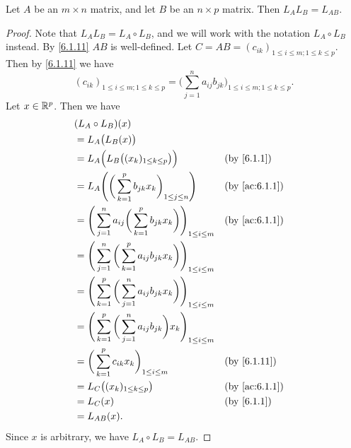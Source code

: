 \begin{lem}\label{6.1.16}
  Let \(A\) be an \(m \times n\) matrix, and let \(B\) be an \(n \times p\) matrix.
  Then \(L_A L_B = L_{AB}\).
\end{lem}

\begin{proof}
  Note that \(L_A L_B = L_A \circ L_B\), and we will work with the notation \(L_A \circ L_B\) instead.
  By \cref{6.1.11} \(AB\) is well-defined.
  Let \(C = AB = (c_{ik})_{1 \leq i \leq m ; 1 \leq k \leq p}\).
  Then by \cref{6.1.11} we have
  \[
    (c_{ik})_{1 \leq i \leq m ; 1 \leq k \leq p} = \bigg(\sum_{j = 1}^n a_{ij} b_{jk}\bigg)_{1 \leq i \leq m ; 1 \leq k \leq p}.
  \]
  Let \(x \in \mathbb{R}^p\).
  Then we have
  \begin{align*}
     & (L_A \circ L_B)(x)                                                                                             \\
     & = L_A\big(L_B(x)\big)                                                                                          \\
     & = L_A\Big(L_B\big((x_k)_{1 \leq k \leq p}\big)\Big)                                         &  & \by{6.1.1}    \\
     & = L_A\Bigg(\bigg(\sum_{k = 1}^p b_{jk} x_k\bigg)_{1 \leq j \leq n}\Bigg)                    &  & \by{ac:6.1.1} \\
     & = \Bigg(\sum_{j = 1}^n a_{ij} \bigg(\sum_{k = 1}^p b_{jk} x_k\bigg)\Bigg)_{1 \leq i \leq m} &  & \by{ac:6.1.1} \\
     & = \Bigg(\sum_{j = 1}^n \bigg(\sum_{k = 1}^p a_{ij} b_{jk} x_k\bigg)\Bigg)_{1 \leq i \leq m}                    \\
     & = \Bigg(\sum_{k = 1}^p \bigg(\sum_{j = 1}^n a_{ij} b_{jk} x_k\bigg)\Bigg)_{1 \leq i \leq m}                    \\
     & = \Bigg(\sum_{k = 1}^p \bigg(\sum_{j = 1}^n a_{ij} b_{jk}\bigg) x_k\Bigg)_{1 \leq i \leq m}                    \\
     & = \bigg(\sum_{k = 1}^p c_{ik} x_k\bigg)_{1 \leq i \leq m}                                   &  & \by{6.1.11}   \\
     & = L_C\big((x_k)_{1 \leq k \leq p}\big)                                                      &  & \by{ac:6.1.1} \\
     & = L_C(x)                                                                                    &  & \by{6.1.1}    \\
     & = L_{AB}(x).
  \end{align*}
  Since \(x\) is arbitrary, we have \(L_A \circ L_B = L_{AB}\).
\end{proof}

